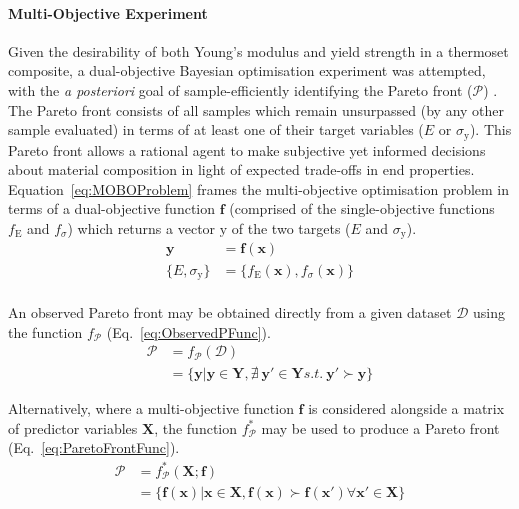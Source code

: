 \paragraph{Multi-Objective Experiment}
Given the desirability of both Young's modulus and yield strength in a
 thermoset composite, a dual-objective Bayesian optimisation experiment was
 attempted, with the \textit{a posteriori} goal of sample-efficiently
 identifying the Pareto front (\(\mathcal{P}\)) \autocite{Garnett2023}.
The Pareto front consists of all samples which remain unsurpassed (by any
 other sample evaluated) in terms of at least one of their target variables
 (\(E\) or \(\sigma_{\mathrm{y}}\)).
This Pareto front allows a rational agent to make subjective yet informed
 decisions about material composition in light of expected trade-offs in
 end properties.
Equation~\ref{eq:MOBOProblem} frames the multi-objective optimisation
 problem in terms of a dual-objective function \(\mathbf{f}\) (comprised of
 the single-objective functions \(f_{\mathrm{E}}\) and \(f_{\sigma}\)) which returns
 a vector \(\mathbf{\mathrm{y}}\) of the two targets (\(E\) and \(\sigma_{\mathrm{y}}\)).
\begin{equation}\label{eq:MOBOProblem}
    \begin{split}
        \mathbf{y}&=\mathbf{f}(\mathbf{x})\\
        \{E,\sigma_{\mathrm{y}}\}&=\{f_{\mathrm{E}}(\mathbf{x}),f_{\sigma}(\mathbf{x})\}\\
    \end{split}
\end{equation}

An observed Pareto front may be obtained directly from a given dataset
 \(\mathcal{D}\) using the function \(f_\mathcal{P}\)
 (Eq.~\ref{eq:ObservedPFunc}).
\begin{equation}\label{eq:ObservedPFunc}
    \begin{split}
        \mathcal{P}&=f_\mathcal{P}(\mathcal{D})\\
        &=\{\mathbf{y}|\mathbf{y}\in\mathbf{Y},\nexists\:\mathbf{y}'\in\mathbf{Y}s.t.\:\mathbf{y}'\succ\mathbf{y}\}
    \end{split}
\end{equation}

Alternatively, where a multi-objective function \(\mathbf{f}\) is
 considered alongside a matrix of predictor variables \(\mathbf{X}\), the
 function \(f_\mathcal{P}^{*}\) may be used to produce a Pareto
 front (Eq.~\ref{eq:ParetoFrontFunc}).
\small
\begin{equation}\label{eq:ParetoFrontFunc}
    \begin{split}
        \mathcal{P}&=f_{\mathcal{P}}^{*}(\mathbf{X};\mathbf{f})\\
        &=\{\mathbf{f}(\mathbf{x})|\mathbf{x}\in\mathbf{X},\mathbf{f}(\mathbf{x})\succ\mathbf{f}(\mathbf{x}')\forall\mathbf{x}'\in\mathbf{X}\}
    \end{split}
\end{equation}
\normalsize


